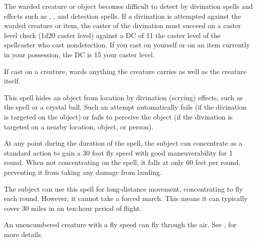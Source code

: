 \begin{spelleffect}
The warded creature or object becomes difficult to detect by divination spells and effects such as , , and detection spells. If a divination is attempted against the warded creature or item, the caster of the divination must succeed on a caster level check (1d20 \add caster level) against a DC of 11 \add the caster level of the spellcaster who cast nondetection. If you cast  on yourself or on an item currently in your possession, the DC is 15 \add your caster level.
\end{spelleffect}
\begin{spellnotes}
If cast on a creature,  wards anything the creature carries as well as the creature itself.
\end{spellnotes}

\begin{spelleffect}
This spell hides an object from location by divination (scrying) effects, such as the  spell or a crystal ball. Such an attempt automatically fails (if the divination is targeted on the object) or fails to perceive the object (if the divination is targeted on a nearby location, object, or person).
\end{spelleffect}

\spelldur{\durext}
\begin{spelleffect}
  At any point during the duration of the spell, the subject can concentrate as a standard action to gain a 30 foot fly speed with good maneuverability for 1 round. When not concentrating on the spell, it falls at only 60 feet per round, preventing it from taking any damage from landing.

  The subject can use this spell for long-distance movement, concentrating to fly each round. However, it cannot take a forced march. This means it can typically cover 30 miles in an ten-hour period of flight.
\end{spelleffect}
\begin{spellnotes}
    An unencumbered creature with a fly speed can fly through the air. See , for more details.
\end{spellnotes}

